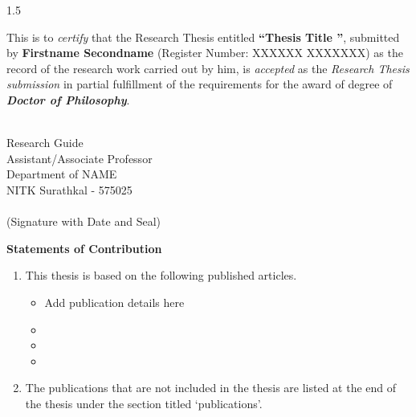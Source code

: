 \documentclass[12pt, twoside,openright]{report}
\begin{document}
\begin{spacing}{1.5}
\begin{titlepage}
\vspace*{0.5in}
\indent This is to \textit{certify} that the Research Thesis entitled {\bf \textquotedblleft{Thesis Title \textquotedblright}}, submitted by {\bf Firstname Secondname} (Register Number: XXXXXX XXXXXXX) as the record of the research work carried out by him, is \textit{accepted} as the \textit{Research Thesis submission} in partial fulfillment of the requirements for the award of degree of {\bf\textit{Doctor of Philosophy}}.

\vspace*{1in}

\begin{singlespacing}
\hspace*{1.5in} 
\parbox{3in}
{ \\
\noindent Research Guide \\ 
\noindent Assistant/Associate Professor\\
\noindent Department of NAME\\
\noindent NITK Surathkal - 575025 
\vspace*{1.2in}\\
 \\
\noindent (Signature with Date and Seal)} 
\end{singlespacing} 
\vspace*{0.25in}
\end{titlepage}


\newpage
\thispagestyle{empty}
\mbox{}
\newpage
\begin{titlepage}
\pagestyle{empty}
\begin{center}
\large \textbf{Statements of Contribution}
\end{center}


\begin{enumerate}
    \item 
   This thesis is based on the following published articles.
\begin{itemize}
    \item Add publication details here
    \item 
    \item
     \item
\end{itemize}
\item
The publications that are not included in the thesis are listed at the end of the thesis under the section titled `publications'.



\end{enumerate}
\end{titlepage}
\end{spacing}
\end{document}
